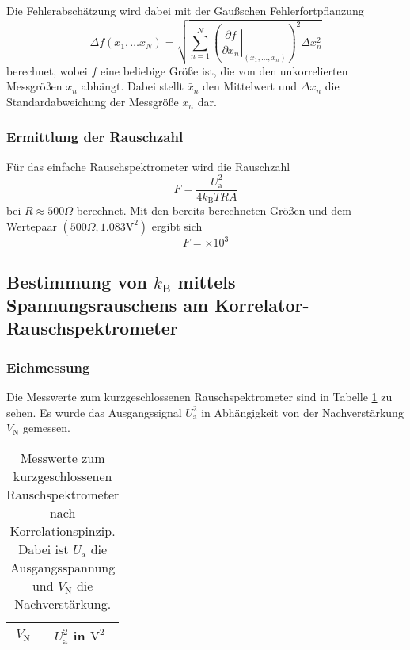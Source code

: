 		Die Fehlerabschätzung wird dabei mit der Gaußschen Fehlerfortpflanzung
		\begin{equation}
		\Delta f(x_1,\ldots x_N)
		=\sqrt{ \sum_{n=1}^N \left(\left.\frac{\partial f}{\partial x_n}\right|
		_{(\bar{x}_1,\ldots,\bar{x}_n)}\right)^2
		\Delta x_n ^2 }
		\end{equation}
		berechnet, wobei $f$ eine beliebige Größe ist, die von den unkorrelierten
		Messgrößen $x_n$ abhängt. Dabei  stellt $\bar{x}_n$ den Mittelwert und
		$\Delta x_n$ die Standardabweichung der Messgröße $x_n$ dar.


	\subsubsection{Ermittlung der Rauschzahl}
		Für das einfache Rauschspektrometer wird die Rauschzahl
		\begin{equation}
			F = \frac{U_\text{a}^2}{4 k_\text{B}T R A}
		\end{equation}
		bei $R\approx 500\Omega$ berechnet. Mit den bereits berechneten Größen und
		dem Wertepaar $(500\Omega,1.083 \text{V}^2)$ ergibt sich
		\begin{equation}
			F =  \times 10^{3}
		\end{equation}






\clearpage
\subsection{Bestimmung von $k_\text{B}$ mittels Spannungsrauschens am
			Korrelator-Rauschspektrometer}

		\subsubsection{Eichmessung}

		Die Messwerte zum kurzgeschlossenen Rauschspektrometer sind
		in Tabelle \ref{tab:eichung_eigenrauschen_korr} zu sehen.
		Es wurde das Ausgangssignal $U^2_\text{a}$ in Abhängigkeit von
		der Nachverstärkung $V_\text{N}$ gemessen.

		\begin{table}[h]
		\centering
			\begin{tabular}{cc}
				\toprule \midrule
				$V_\text{N}$ & $U^2_\text{a}$ in $\text{V}^2$
				\\
				\midrule
				
				\midrule \bottomrule
			\end{tabular}
			\caption{Messwerte zum kurzgeschlossenen
			Rauschspektrometer nach Korrelationspinzip. Dabei ist $U_\text{a}$ die
			Ausgangsspannung und $V_\text{N}$ die Nachverstärkung.}
			\label{tab:eichung_eigenrauschen_korr}
		\end{table}

